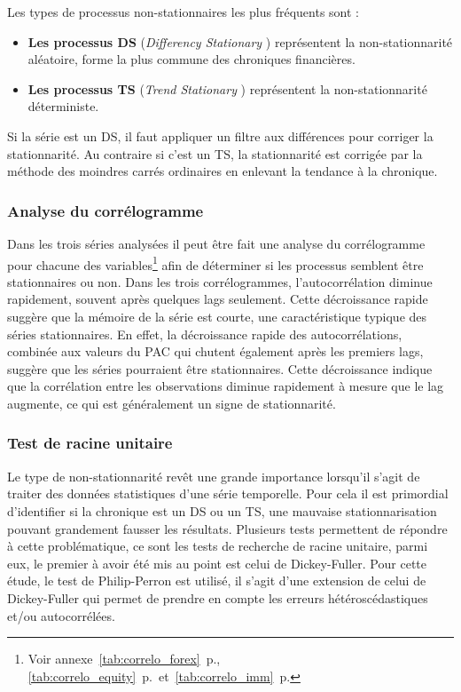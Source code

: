 Les types de processus non-stationnaires les plus fréquents sont :
\begin{itemize}
    \item \textbf{Les processus DS}  (\textit{Differency Stationary} ) représentent la non-stationnarité aléatoire, forme la plus commune des chroniques financières.
    \item \textbf{Les processus TS}  (\textit{Trend Stationary} ) représentent la non-stationnarité déterministe.
\end{itemize}
Si la série est un DS, il faut appliquer un filtre aux différences pour corriger la stationnarité. Au contraire si c'est un TS, la stationnarité est corrigée par la 
méthode des moindres carrés ordinaires en enlevant la tendance à la chronique.

\subsubsection{Analyse du corrélogramme}

Dans les trois séries analysées il peut être fait une analyse du corrélogramme pour chacune des variables\footnote{Voir annexe~\autoref{tab:correlo_forex}~p.\pageref{tab:correlo_forex}, \autoref{tab:correlo_equity}~p.\pageref{tab:correlo_equity}~et~\autoref{tab:correlo_imm}~p.\pageref{tab:correlo_imm}} afin de déterminer si les processus semblent être stationnaires ou non. Dans les trois corrélogrammes, l'autocorrélation diminue rapidement, souvent après quelques lags seulement. Cette décroissance rapide suggère que la mémoire de la série est courte, une caractéristique typique des séries stationnaires. En effet, la décroissance rapide des autocorrélations, combinée aux valeurs du PAC qui chutent également après les premiers lags, suggère que les séries pourraient être stationnaires. Cette décroissance indique que la corrélation entre les observations diminue rapidement à mesure que le lag augmente, ce qui est généralement un signe de stationnarité.

\subsubsection{Test de racine unitaire}

Le type de non-stationnarité revêt une grande importance lorsqu'il s'agit de traiter des données statistiques d'une série temporelle. Pour cela il est primordial d'identifier si la chronique est un DS ou un TS, une mauvaise stationnarisation pouvant grandement fausser les résultats. Plusieurs tests permettent de répondre à cette problématique, ce sont les tests de recherche de racine unitaire, parmi eux, le premier à avoir été mis au point est celui de Dickey-Fuller. Pour cette étude, le test de Philip-Perron est utilisé, il s'agit d'une extension de celui de Dickey-Fuller qui permet de prendre en compte les erreurs hétéroscédastiques 
et/ou autocorrélées.\\[11pt]


